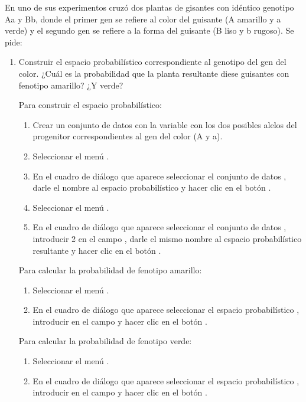 \begin{enumerate}[leftmargin=*]
En uno de sus experimentos cruzó dos plantas de gisantes con idéntico genotipo Aa y Bb, donde el primer gen se refiere al color del guisante
(A amarillo y a verde) y el segundo gen se refiere a la forma del guisante (B liso y b rugoso). Se pide:
\begin{enumerate}
\item Construir el espacio probabilístico correspondiente al genotipo del gen del color. 
¿Cuál es la probabilidad que la planta resultante diese guisantes con fenotipo amarillo? 
¿Y verde?
\begin{indicacion}
Para construir el espacio probabilístico: 
\begin{enumerate}
\item Crear un conjunto de datos  con la variable  con los dos posibles alelos del
progenitor correspondientes al gen del color (A y a).
\item Seleccionar el menú .
\item En el cuadro de diálogo que aparece seleccionar el conjunto de datos , darle el nombre
 al espacio probabilístico y hacer clic en el botón .
\item Seleccionar el menú .
\item En el cuadro de diálogo que aparece seleccionar el conjunto de datos , introducir 2 en el campo
, darle el mismo nombre al espacio probabilístico resultante y hacer clic en el botón . 
\end{enumerate}
Para calcular la probabilidad de fenotipo amarillo:
\begin{enumerate}
\item Seleccionar el menú .
\item En el cuadro de diálogo que aparece seleccionar el espacio probabilístico , introducir
 en el campo  y hacer clic en el
botón .
\end{enumerate}
Para calcular la probabilidad de fenotipo verde:
\begin{enumerate}
\item Seleccionar el menú .
\item En el cuadro de diálogo que aparece seleccionar el espacio probabilístico , introducir
 en el campo  y hacer clic en el
botón .
\end{enumerate}
\end{indicacion}


\end{enumerate}
\end{enumerate}
